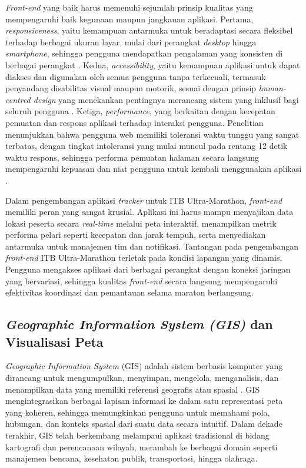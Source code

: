 \textit{Front-end} yang baik harus memenuhi sejumlah prinsip kualitas yang mempengaruhi baik kegunaan maupun jangkauan aplikasi. Pertama, \textit{responsiveness}, yaitu kemampuan antarmuka untuk beradaptasi secara fleksibel terhadap berbagai ukuran layar, mulai dari perangkat \textit{desktop} hingga \textit{smartphone}, sehingga pengguna mendapatkan pengalaman yang konsisten di berbagai perangkat \cite{marcotte2017responsive}. Kedua, \textit{accessibility}, yaitu kemampuan aplikasi untuk dapat diakses dan digunakan oleh semua pengguna tanpa terkecuali, termasuk penyandang disabilitas visual maupun motorik, sesuai dengan prinsip \textit{human-centred design} yang menekankan pentingnya merancang sistem yang inklusif bagi seluruh pengguna \cite{maguire2001methods}. Ketiga, \textit{performance}, yang berkaitan dengan kecepatan pemuatan dan respons aplikasi terhadap interaksi pengguna. Penelitian menunjukkan bahwa pengguna web memiliki toleransi waktu tunggu yang sangat terbatas, dengan tingkat intoleransi yang mulai muncul pada rentang 12 detik waktu respons, sehingga performa pemuatan halaman secara langsung mempengaruhi kepuasan dan niat pengguna untuk kembali menggunakan aplikasi \cite{nah2004study}.

Dalam pengembangan aplikasi \textit{tracker} untuk ITB Ultra-Marathon, \textit{front-end} memiliki peran yang sangat krusial. Aplikasi ini harus mampu menyajikan data lokasi peserta secara \textit{real-time} melalui peta interaktif, menampilkan metrik performa pelari seperti kecepatan dan jarak tempuh, serta menyediakan antarmuka untuk manajemen tim dan notifikasi. Tantangan pada pengembangan \textit{front-end} ITB Ultra-Marathon terletak pada kondisi lapangan yang dinamis. Pengguna mengakses aplikasi dari berbagai perangkat dengan koneksi jaringan yang bervariasi, sehingga kualitas \textit{front-end} secara langsung mempengaruhi efektivitas koordinasi dan pemantauan selama maraton berlangsung. 

\subsection{\textit{Geographic Information System (GIS)} dan Visualisasi Peta}
\textit{Geographic Information System} (GIS) adalah sistem berbasis komputer yang dirancang untuk mengumpulkan, menyimpan, mengelola, menganalisis, dan menampilkan data yang memiliki referensi geografis atau spasial \cite{longley2015geographic}. GIS mengintegrasikan berbagai lapisan informasi ke dalam satu representasi peta yang koheren, sehingga memungkinkan pengguna untuk memahami pola, hubungan, dan konteks spasial dari suatu data secara intuitif. Dalam dekade terakhir, GIS telah berkembang melampaui aplikasi tradisional di bidang kartografi dan perencanaan wilayah, merambah ke berbagai domain seperti manajemen bencana, kesehatan publik, transportasi, hingga olahraga.

